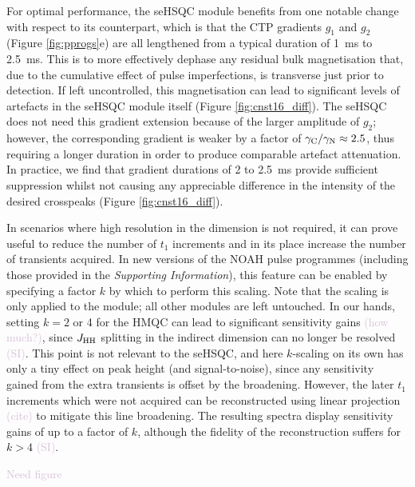 \documentclass[11pt]{article}
\newcommand*{\carbon}{\ce{^{13}C}}
\newcommand*{\nitrogen}{\ce{^{15}N}}
\newcommand*{\hl}[1]{\textcolor{Thistle}{#1}}
\newcommand*{\jhh}{J_{\ce{HH}}}
\newcommand*{\figref}[1]{Figure \ref{fig:#1}}
\newcommand*{\SInf}{\textit{Supporting Information}}
\newcommand*{\sitodo}{\hl{(SI)}}
\begin{document}
For optimal performance, the \nitrogen{} seHSQC module benefits from one notable change with respect to its \carbon{} counterpart, which is that the CTP gradients $g_1$ and $g_2$ (\figref{pprogs}e) are all lengthened from a typical duration of \SI{1}{\ms} to \SI{2.5}{\ms}.
This is to more effectively dephase any residual bulk magnetisation that, due to the cumulative effect of pulse imperfections, is transverse just prior to detection.
If left uncontrolled, this magnetisation can lead to significant levels of artefacts in the seHSQC module itself (\figref{cnst16_diff}).
The \carbon{} seHSQC does not need this gradient extension because of the larger amplitude of $g_2$; however, the corresponding \nitrogen{} gradient is weaker by a factor of $\gamma_{\ce{C}}/\gamma_{\ce{N}} \approx 2.5$, thus requiring a longer duration in order to produce comparable artefact attenuation.
In practice, we find that gradient durations of 2 to \SI{2.5}{\ms} provide sufficient suppression whilst not causing any appreciable difference in the intensity of the desired crosspeaks (\figref{cnst16_diff}).

In scenarios where high resolution in the \nitrogen{} dimension is not required, it can prove useful to reduce the number of $t_1$ increments and in its place increase the number of transients acquired.\autocite{Perez-Trujillo2007MRC, Parella2010CMR}
In new versions of the NOAH pulse programmes (including those provided in the \SInf{}), this feature can be enabled by specifying a factor $k$ by which to perform this scaling.
Note that the scaling is only applied to the \nitrogen{} module; all other modules are left untouched.
In our hands, setting $k = 2$ or 4 for the \nitrogen{} HMQC can lead to significant sensitivity gains \hl{(how much?)}, since $\jhh$ splitting in the indirect dimension can no longer be resolved \sitodo{}.
This point is not relevant to the seHSQC, and here $k$-scaling on its own has only a tiny effect on peak height (and signal-to-noise), since any sensitivity gained from the extra transients is offset by the broadening.
However, the later $t_1$ increments which were not acquired can be reconstructed using linear projection \hl{(cite)} to mitigate this line broadening.
The resulting spectra display sensitivity gains of up to a factor of $k$, although the fidelity of the reconstruction suffers for $k > 4$ \sitodo.


\hl{Need figure}
\end{document}
